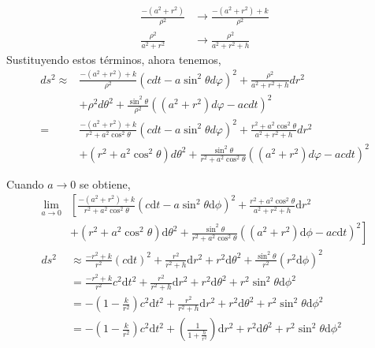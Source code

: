 \begin{align}
    \frac{-\left(a^2+r^2\right)}{\rho^2} & \rightarrow \frac{-\left(a^2+r^2\right)+k}{\rho^2} \\
    \frac{\rho^2}{a^2+r^2}               & \rightarrow \frac{\rho^2}{a^2+r^2+h}
\end{align}
Sustituyendo estos términos, ahora tenemos,
\begin{align}
    d s^2 \approx & \frac{-\left(a^2+r^2\right)+k}{\rho^2}\left(c d t-a \sin ^2 \theta d \varphi\right)^2+\frac{\rho^2}{a^2+r^2+h} d r^2                                 \\
                  & +\rho^2 d \theta^2+\frac{\sin ^2 \theta}{\rho^2}\left(\left(a^2+r^2\right) d \varphi-a c d t\right)^2                                                \\
    =             & \frac{-\left(a^2+r^2\right)+k}{r^2+a^2 \cos ^2 \theta}\left(c d t-a \sin ^2 \theta d \varphi\right)^2+\frac{r^2+a^2 \cos ^2 \theta}{a^2+r^2+h} d r^2 \\
                  & +\left(r^2+a^2 \cos ^2 \theta\right) d \theta^2+\frac{\sin ^2 \theta}{r^2+a^2 \cos ^2 \theta}\left(\left(a^2+r^2\right) d \varphi-a c d t\right)^2
\end{align}

Cuando $a \rightarrow 0$ se obtiene,
\begin{align*}
    \lim _{a \rightarrow 0} & \left[ \frac{-(a^2+r^2)+k}{r^2+a^2 \cos^2 \theta}(c\mathrm{d}t-a\sin^2\theta\mathrm{d}\phi)^2 + \frac{r^2+a^2\cos^2\theta}{a^2+r^2+h}\mathrm{d}r^2 \right.      \\
                            & +\left. (r^2+a^2\cos^2\theta)\mathrm{d}\theta^2 + \frac{\sin^2\theta}{r^2+a^2\cos^2\theta}\left((a^2+r^2)\mathrm{d}\phi - ac\mathrm{d}t\right)^2 \right]        \\
    ds^2                    & \approx \frac{-r^2+k}{r^2}(c\mathrm{d}t)^2 + \frac{r^2}{r^2+h}\mathrm{d}r^2 + r^2\mathrm{d}\theta^2 + \frac{\sin^2\theta}{r^2}(r^2\mathrm{d}\phi)^2             \\
                            & = \frac{-r^2+k}{r^2}c^2\mathrm{d}t^2 + \frac{r^2}{r^2+h}\mathrm{d}r^2 + r^2\mathrm{d}\theta^2 + r^2\sin^2\theta\mathrm{d}\phi^2                                 \\
                            & = -\left(1-\frac{k}{r^2}\right)c^2\mathrm{d}t^2 + \frac{r^2}{r^2+h}\mathrm{d}r^2 + r^2\mathrm{d}\theta^2 + r^2\sin^2\theta\mathrm{d}\phi^2                      \\
                            & = -\left(1-\frac{k}{r^2}\right)c^2\mathrm{d}t^2 + \left(\frac{1}{1+\frac{h}{r^2}}\right)\mathrm{d}r^2 + r^2\mathrm{d}\theta^2 + r^2\sin^2\theta\mathrm{d}\phi^2
\end{align*}

